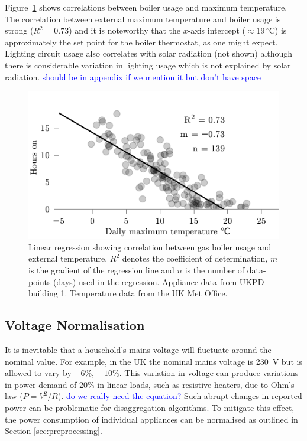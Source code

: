 \documentclass{sig-alternate}
\newcommand{\bluecolor}[1]{\textcolor{blue}{#1}}
\begin{document}
Figure~\ref{fig:weather_correlations} shows correlations between
boiler usage and maximum temperature.  The correlation between
external maximum temperature and boiler usage is strong ($R^2=0.73$) and it is
noteworthy that the $x$-axis intercept ($\approx19\,^{\circ}\mathrm{C}$)
is approximately the set point for the boiler thermostat, as one might
expect.  Lighting circuit usage also correlates with solar radiation
(not shown) although there is considerable variation in lighting usage
which is not explained by solar radiation. \bluecolor{should be in appendix if we mention it but don't have space}

\begin{figure}[!t]
  \centering
  \includegraphics[width=\columnwidth]{figures/weather_correlations2.pdf} 
  \caption{Linear regression showing correlation between gas boiler
    usage and external temperature. $R^2$ denotes the coefficient of
    determination, $m$ is the gradient of the regression line and $n$
    is the number of data-points (days) used in the regression. Appliance
    data from UKPD building 1.  Temperature data from the UK Met Office.}
  \label{fig:weather_correlations} 
\end{figure}

\subsection{Voltage Normalisation}

\noindent
It is inevitable that a household's mains voltage will fluctuate around the nominal value. For example, in the UK the nominal mains voltage is 230~V but is allowed to vary by
$-6\%,\;{+10}\%$.  This variation in voltage can produce variations in power demand of 20\% in linear loads, such as resistive heaters, 
due to Ohm's law ($P=V^2/R$). \bluecolor{do we really need the equation?}
Such abrupt changes in reported power can be
problematic for disaggregation algorithms.  To mitigate this effect, the power consumption of individual appliances can be normalised as outlined in Section \ref{sec:preprocessing}.
\end{document}
